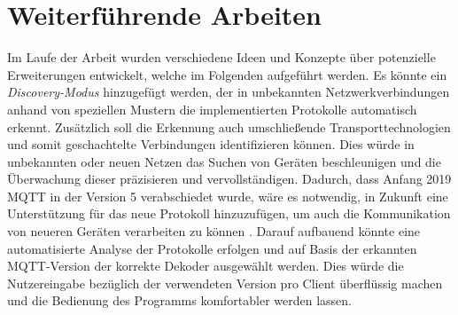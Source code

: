 \section{Weiterführende Arbeiten}
Im Laufe der Arbeit wurden verschiedene Ideen und Konzepte über potenzielle Erweiterungen entwickelt, welche im Folgenden aufgeführt werden.
Es könnte ein \emph{Discovery-Modus} hinzugefügt werden, der in unbekannten Netzwerkverbindungen anhand von speziellen Mustern die implementierten Protokolle automatisch erkennt. Zusätzlich soll die Erkennung auch umschließende Transporttechnologien und somit geschachtelte Verbindungen identifizieren können. Dies würde in unbekannten oder neuen Netzen das Suchen von Geräten beschleunigen und die Überwachung dieser präzisieren und vervollständigen.
Dadurch, dass Anfang 2019 MQTT in der Version 5 verabschiedet wurde, wäre es notwendig, in Zukunft eine Unterstützung für das neue Protokoll hinzuzufügen, um auch die Kommunikation von neueren Geräten verarbeiten zu können \cite{mqtt_org_2019}.
Darauf aufbauend könnte eine automatisierte Analyse der Protokolle erfolgen und auf Basis der erkannten \ac{MQTT}-Version der korrekte Dekoder ausgewählt werden. Dies würde die Nutzereingabe bezüglich der verwendeten Version pro Client überflüssig machen und die Bedienung des Programms komfortabler werden lassen.
